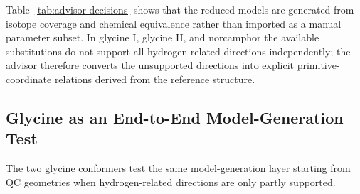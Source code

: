\documentclass[aip,jcp,reprint,longbibliography,floatfix]{revtex4-2}
\begin{document}
Table~\ref{tab:advisor-decisions} shows that the reduced models are generated
from isotope coverage and chemical equivalence rather than imported as a
manual parameter subset. In glycine I, glycine II, and norcamphor the available
substitutions do not support all hydrogen-related directions independently;
the advisor therefore converts the unsupported directions into explicit
primitive-coordinate relations derived from the reference structure.

\subsection{Glycine as an End-to-End Model-Generation Test}

The two glycine conformers test the same model-generation layer starting
from QC geometries when hydrogen-related directions are only partly supported. 
\end{document}
